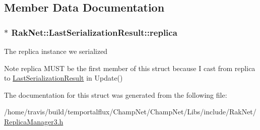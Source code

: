 \subsection{Member Data Documentation}
\hypertarget{struct_rak_net_1_1_last_serialization_result_acef6e348bfcacf510597437f53fcde97}{
\subsubsection[{replica}]{$\ast$ Rak\-Net\-::\-Last\-Serialization\-Result\-::replica}}\label{struct_rak_net_1_1_last_serialization_result_acef6e348bfcacf510597437f53fcde97}
The replica instance we serialized \begin{DoxyNote}{Note}
replica M\-U\-S\-T be the first member of this struct because I cast from replica to \hyperlink{struct_rak_net_1_1_last_serialization_result}{Last\-Serialization\-Result} in Update() 
\end{DoxyNote}


The documentation for this struct was generated from the following file\-:\begin{DoxyCompactItemize}
\item 
/home/travis/build/temportalflux/\-Champ\-Net/\-Champ\-Net/\-Libs/include/\-Rak\-Net/\hyperlink{_replica_manager3_8h}{Replica\-Manager3.\-h}\end{DoxyCompactItemize}
